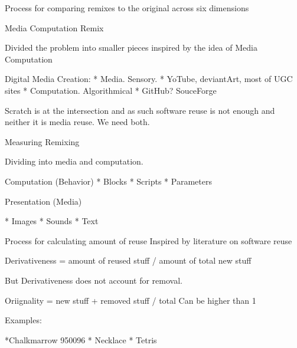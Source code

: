 Process for comparing remixes to the original across six dimensions


Media Computation Remix

Divided the problem into smaller pieces inspired by the idea of Media Computation \cite{guzdial}



Digital Media Creation:
* Media. Sensory.
	* YoTube, deviantArt, most of UGC sites
* Computation. Algorithmical
	* GitHub? SouceForge

Scratch is at the intersection and as such software reuse is not enough and neither it is media reuse. 
We need both.

Measuring Remixing

Dividing into media and computation. 

Computation (Behavior)
* Blocks
* Scripts
* Parameters

Presentation (Media)

* Images
* Sounds
* Text

Process for calculating amount of reuse Inspired by literature on software reuse \cite{farkes_terry} 

Derivativeness = amount of reused stuff  / amount of total new stuff

But Derivativeness does not account for removal.

Oriignality = new stuff + removed stuff / total Can be higher than 1

Examples:

*Chalkmarrow 950096
* Necklace
* Tetris





